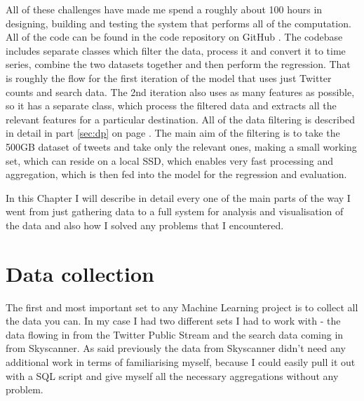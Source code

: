 \documentclass[minf,frontabs,twoside,singlespacing,parskip]{infthesis}
\begin{document}
All of these challenges have made me spend a roughly about 100 hours in designing, building and testing the system that performs all of the computation. All of the code can be found in the code repository on GitHub \cite{code}. The codebase includes separate classes which filter the data, process it and convert it to time series, combine the two datasets together and then perform the regression. That is roughly the flow for the first iteration of the model that uses just Twitter counts and search data. The 2nd iteration also uses as many features as possible, so it has a separate class, which process the filtered data and extracts all the relevant features for a particular destination. All of the data filtering is described in detail in part  \ref{sec:dp} on page \pageref{sec:dp}. The main aim of the filtering is to take the 500GB dataset of tweets and take only the relevant ones, making a small working set, which can reside on a local SSD, which enables very fast processing and aggregation, which is then fed into the model for the regression and evaluation. 


In this Chapter I will describe in detail every one of the main parts of the way I went from just gathering data to a full system for analysis and visualisation of the data and also how I solved any problems that I encountered.


\section{Data collection}
\label{sec:dc}


The first and most important set to any Machine Learning project is to collect all the data you can. In my case I had two different sets I had to work with - the data flowing in from the Twitter Public Stream and the search data coming in from Skyscanner. As said previously the data from Skyscanner didn't need any additional work in terms of familiarising myself, because I could easily pull it out with a SQL script and give myself all the necessary aggregations without any problem. 
\end{document}

